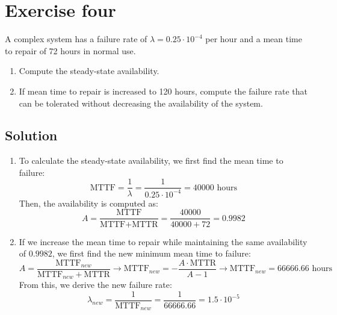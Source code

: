 \section{Exercise four}

A complex system has a failure rate of $\lambda = 0.25 \cdot 10^{-4}$ per hour and a mean time to repair of 72 hours in normal use.
\begin{enumerate}
    \item Compute the steady-state availability.
    \item If mean time to repair is increased to 120 hours, compute the failure rate that can be tolerated without decreasing the availability of the system.
\end{enumerate}

\subsection*{Solution}
\begin{enumerate}
    \item To calculate the steady-state availability, we first find the mean time to failure:
        \[\text{MTTF}=\dfrac{1}{\lambda}=\dfrac{1}{0.25 \cdot 10^{-4}}=40000 \text{ hours}\]
        Then, the availability is computed as:
        \[A=\dfrac{\text{MTTF}}{\text{MTTF}+\text{MTTR}}=\dfrac{40000}{40000+72}=0.9982\]
    \item If we increase the mean time to repair while maintaining the same availability of $0.9982$, we first find the new minimum mean time to failure:
        \[A=\dfrac{\text{MTTF}_{new}}{\text{MTTF}_{new}+\text{MTTR}}\rightarrow\text{MTTF}_{new}=-\dfrac{A\cdot\text{MTTR}}{A-1}\rightarrow\text{MTTF}_{new}=66666.66\text{ hours}\]
        From this, we derive the new failure rate:
        \[\lambda_{new}=\dfrac{1}{\text{MTTF}_{new}}=\dfrac{1}{66666.66}=1.5\cdot 10^{-5}\]
\end{enumerate}